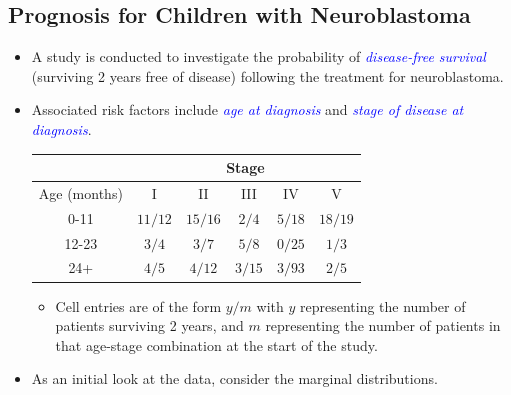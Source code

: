 \documentclass{article}\usepackage[]{graphicx}\usepackage[svgnames]{xcolor}
\begin{document}
\subsection*{Prognosis for Children with Neuroblastoma}
\begin{itemize}
    \item A study is conducted to investigate the probability of \textcolor{Blue}{\emph{disease-free survival}}
          (surviving 2 years free of disease) following the treatment for neuroblastoma.
    \item Associated risk factors include \textcolor{Blue}{\emph{age at diagnosis}} and \textcolor{Blue}{\emph{stage of disease at diagnosis}}.
          \begin{table}
              \centering
              \begin{tabular}{cccccc}
                  \toprule
                               & \multicolumn{5}{c}{Stage}                                               \\
                  \midrule
                  Age (months) & I                         & II        & III      & IV       & V         \\
                  \midrule
                  0-11         & $ 11/12 $                 & $ 15/16 $ & $ 2/4 $  & $ 5/18 $ & $ 18/19 $ \\
                  12-23        & $ 3/4 $                   & $ 3/7 $   & $ 5/8 $  & $ 0/25 $ & $ 1/3 $   \\
                  24+          & $ 4/5 $                   & $ 4/12 $  & $ 3/15 $ & $ 3/93 $ & $ 2/5 $   \\
                  \bottomrule
              \end{tabular}
          \end{table}
          \begin{itemize}
              \item Cell entries are of the form $y/m$ with $y$ representing the number of patients surviving 2
                    years, and $m$ representing the number of patients in that age-stage combination at the
                    start of the study.
          \end{itemize}
    \item As an initial look at the data, consider the marginal distributions.
          \begin{table}[!htbp]
              \centering
              \begin{NiceTabular}{cccccc|c}
                  \toprule

\end{NiceTabular}
\end{table}
\end{itemize}
\end{document}
